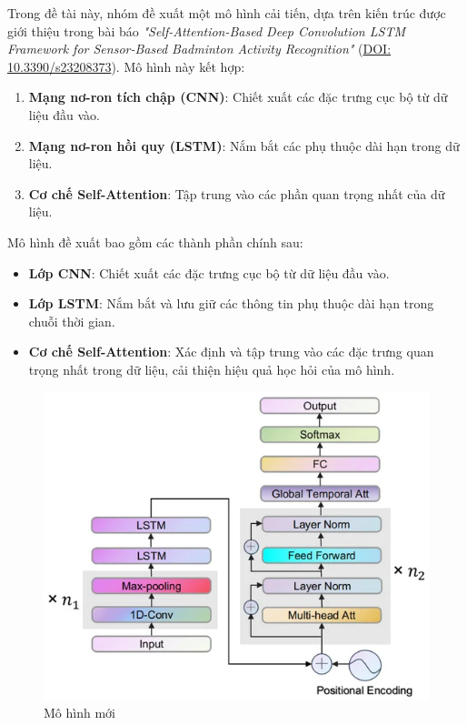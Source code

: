 Trong đề tài này, nhóm đề xuất một mô hình cải tiến, dựa trên kiến trúc được giới thiệu trong bài báo \textit{"Self-Attention-Based Deep Convolution LSTM Framework for Sensor-Based Badminton Activity Recognition"} (\href{https://doi.org/10.3390/s23208373}{DOI: 10.3390/s23208373}). Mô hình này kết hợp:
\begin{enumerate}
    \item \textbf{Mạng nơ-ron tích chập (CNN)}: Chiết xuất các đặc trưng cục bộ từ dữ liệu đầu vào.
    \item \textbf{Mạng nơ-ron hồi quy (LSTM)}: Nắm bắt các phụ thuộc dài hạn trong dữ liệu.
    \item \textbf{Cơ chế Self-Attention}: Tập trung vào các phần quan trọng nhất của dữ liệu.
\end{enumerate}

Mô hình đề xuất bao gồm các thành phần chính sau:
\begin{itemize}
    \item \textbf{Lớp CNN}: Chiết xuất các đặc trưng cục bộ từ dữ liệu đầu vào.
    \item \textbf{Lớp LSTM}: Nắm bắt và lưu giữ các thông tin phụ thuộc dài hạn trong chuỗi thời gian.
    \item \textbf{Cơ chế Self-Attention}: Xác định và tập trung vào các đặc trưng quan trọng nhất trong dữ liệu, cải thiện hiệu quả học hỏi của mô hình.
\end{itemize}

\begin{figure}[H]
    \centering
    \includegraphics[width=0.8\linewidth]{Images/Architecture/SADeepConv.png}
    \caption{Mô hình mới}
    \label{fig:new-model}
\end{figure}


